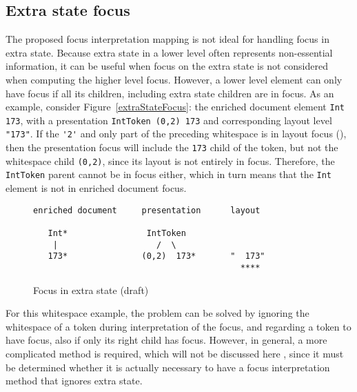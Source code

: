 %																
\subsection{Extra state focus}

The proposed focus interpretation mapping is not ideal for handling focus in extra state. Because extra state in a lower level often represents non-essential information, it can be useful when focus on the extra state is not considered when computing the higher level focus. However, a lower level element can only have focus if all its children, including extra state children are in focus. As an example, consider Figure~\ref{extraStateFocus}: the enriched document element \verb|Int 173|, with a presentation \verb|IntToken (0,2) 173| and corresponding layout level \verb|"|\textvisiblespace\textvisiblespace\verb|173"|. If the \verb|'2'| and only part of the preceding whitespace is in layout focus ({\tt \textvisiblespace{}}), then the presentation focus will include the \verb|173| child of the token, but not the whitespace child \verb|(0,2)|, since its layout is not entirely in focus. Therefore, the \verb|IntToken| parent cannot be in focus either, which in turn means that the \verb|Int| element is not in enriched document focus. 

\begin{figure}
\begin{small}
\begin{center}
\begin{verbatim}
enriched document     presentation      layout

   Int*                IntToken     
    |                    /  \    
   173*               (0,2)  173*       "  173"
                                          ****
\end{verbatim}
\caption{Focus in extra state (draft)}\label{extraStateFocusunpresentableFocus} 
\end{center}
\end{small}
\end{figure}

For this whitespace example, the problem can be solved by ignoring the whitespace of a token during interpretation of the focus, and regarding a token to have focus, also if only its right child has focus. However, in general, a more complicated method is required, which will not be discussed here , since it must be determined whether it is actually necessary to have a focus interpretation method that ignores extra state. 

